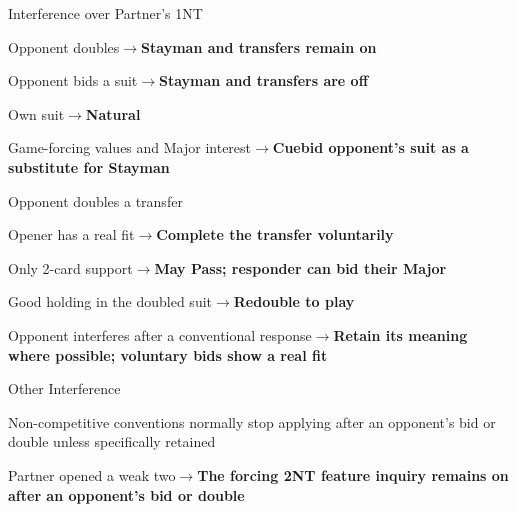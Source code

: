 \documentclass[10pt,letterpaper]{article}
\begin{document}
\begin{minipage}[t]{0.485\textwidth}\vspace{0pt}

\begin{guidecard}{Interference over Partner's 1NT}
\begin{branches}
\item Opponent doubles\;\ensuremath{\longrightarrow}\;\textbf{Stayman and transfers remain on}
\item Opponent bids a suit\;\ensuremath{\longrightarrow}\;\textbf{Stayman and transfers are off}
\begin{branches}
\item Own suit\;\ensuremath{\longrightarrow}\;\textbf{Natural}
\item Game-forcing values and Major interest\;\ensuremath{\longrightarrow}\;\textbf{Cuebid opponent's suit as a substitute for Stayman}
\end{branches}
\item Opponent doubles a transfer
\begin{branches}
\item Opener has a real fit\;\ensuremath{\longrightarrow}\;\textbf{Complete the transfer voluntarily}
\item Only 2-card support\;\ensuremath{\longrightarrow}\;\textbf{May Pass; responder can bid their Major}
\item Good holding in the doubled suit\;\ensuremath{\longrightarrow}\;\textbf{Redouble to play}
\end{branches}
\item Opponent interferes after a conventional response\;\ensuremath{\longrightarrow}\;\textbf{Retain its meaning where possible; voluntary bids show a real fit}
\end{branches}
\end{guidecard}

\begin{guidecard}{Other Interference}
\begin{branches}
\item Non-competitive conventions normally stop applying after an opponent's bid or double unless specifically retained
\item Partner opened a weak two\;\ensuremath{\longrightarrow}\;\textbf{The forcing 2NT feature inquiry remains on after an opponent's bid or double}
\end{branches}
\end{guidecard}


\end{minipage}
\end{document}
